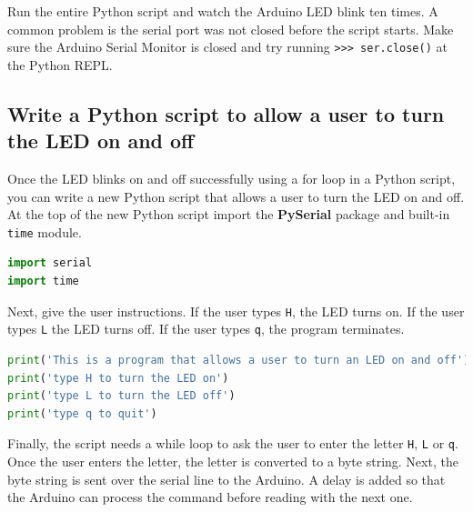 \documentclass{book}
\begin{document}
    
        Run the entire Python script and watch the Arduino LED blink ten times.
A common problem is the serial port was not closed before the script
starts. Make sure the Arduino Serial Monitor is closed and try running
\lstinline!>>> ser.close()! at the Python REPL.
    




    
        \subsection{Write a Python script to allow a user to turn the LED on and
off}\label{write-a-python-script-to-allow-a-user-to-turn-the-led-on-and-off}
    




    
        Once the LED blinks on and off successfully using a for loop in a Python
script, you can write a new Python script that allows a user to turn the
LED on and off. At the top of the new Python script import the
\textbf{PySerial} package and built-in \lstinline!time! module.
    




    
        \begin{lstlisting}[language=Python]
import serial
import time
\end{lstlisting}
    




    
        Next, give the user instructions. If the user types \lstinline!H!, the
LED turns on. If the user types \lstinline!L! the LED turns off. If the
user types \lstinline!q!, the program terminates.
    




    
        \begin{lstlisting}[language=Python]
print('This is a program that allows a user to turn an LED on and off')
print('type H to turn the LED on')
print('type L to turn the LED off')
print('type q to quit')
\end{lstlisting}
    




    
        Finally, the script needs a while loop to ask the user to enter the
letter \lstinline!H!, \lstinline!L! or \lstinline!q!. Once the user
enters the letter, the letter is converted to a byte string. Next, the
byte string is sent over the serial line to the Arduino. A delay is
added so that the Arduino can process the command before reading with
the next one.
    
\end{document}
